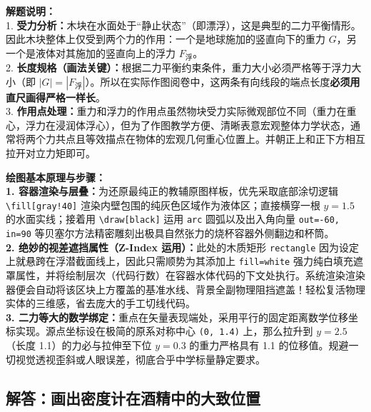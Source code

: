 \vspace{0.6cm}

{\small\color{gray}
\textbf{解题说明：}\\
1. \textbf{受力分析：}木块在水面处于“静止状态”（即漂浮），这是典型的二力平衡情形。因此木块整体上仅受到两个力的作用：一个是地球施加的竖直向下的重力 $G$，另一个是液体对其施加的竖直向上的浮力 $F_{\text{浮}}$。\\
2. \textbf{长度规格（画法关键）：}根据二力平衡约束条件，重力大小必须严格等于浮力大小（即 $|G| = |F_{\text{浮}}|$）。所以在实际作图阅卷中，这两条有向线段的端点长度\textbf{必须用直尺画得严格一样长}。\\
3. \textbf{作用点处理：}重力和浮力的作用点虽然物块受力实际微观部位不同（重力在重心，浮力在浸润体浮心），但为了作图教学方便、清晰表意宏观整体力学状态，通常将两个力共点且等效描点在物体的宏观几何重心位置上。并朝正上和正下方相互拉开对立力矩即可。
}

\vspace{0.6cm}

{\small\color{blue!70!black}
\textbf{绘图基本原理与步骤：}\\
\textbf{1. 容器渲染与层叠：}为还原最纯正的教辅原图样板，优先采取底部涂切逻辑 \texttt{\textbackslash fill[gray!40]} 渲染内壁包围的纯灰色区域作为液体区；直接横穿一根 $y=1.5$ 的水面实线；接着用 \texttt{\textbackslash draw[black]} 运用 \texttt{arc} 圆弧以及出入角向量 \texttt{out=-60, in=90} 等贝塞尔方法精密雕刻出极具自然张力的烧杯容器外侧翻边和杯筒。\\
\textbf{2. 绝妙的视差遮挡属性（Z-Index 运用）：}此处的木质矩形 \texttt{rectangle} 因为设定上就悬跨在浮潜截面线上，因此只需顺势为其添加上 \texttt{fill=white} 强力纯白填充遮罩属性，并将绘制层次（代码行数）在容器水体代码的下文处执行。系统渲染渲染器便会自动将该区块上方覆盖的基准水线、背景全副物理阻挡遮盖！轻松复活物理实体的三维感，省去庞大的手工切线代码。\\
\textbf{3. 二力等大的数学绑定：}重点在矢量表现端处，采用平行的固定距离数学位移坐标实现。源点坐标设在极简的原系对称中心 \texttt{(0, 1.4)} 上，那么拉升到 $y=2.5$ （长度 1.1）的力必与拉伸至下位 $y=0.3$ 的重力严格具有 1.1 的位移值。规避一切视觉透视歪斜或人眼误差，彻底合乎中学标量静定要求。
}

\vspace{1.0cm}


\newpage

\subsection{解答：画出密度计在酒精中的大致位置}


